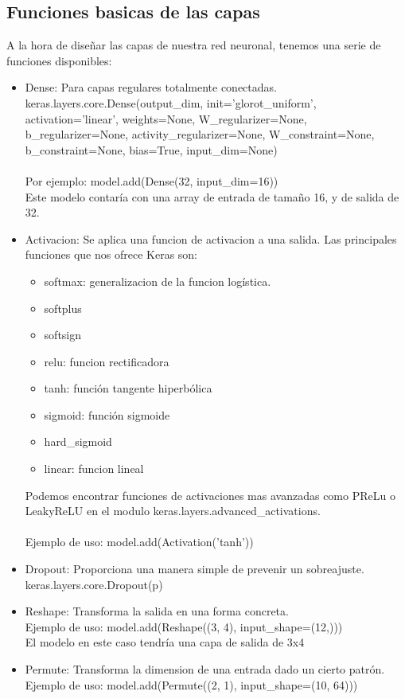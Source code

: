 \subsection{Funciones basicas de las capas}
A la hora de diseñar las capas de nuestra red neuronal, tenemos una serie de funciones disponibles:
\begin{itemize}
\item Dense: Para capas regulares totalmente conectadas.\\
keras.layers.core.Dense(output\_dim, init='glorot\_uniform', activation='linear', weights=None, W\_regularizer=None, b\_regularizer=None, activity\_regularizer=None, W\_constraint=None, b\_constraint=None, bias=True, input\_dim=None)\\\\
Por ejemplo: model.add(Dense(32, input\_dim=16))\\
Este modelo contaría con una array de entrada de tamaño 16, y de salida de 32.
\item Activacion: Se aplica una funcion de activacion a una salida. Las principales funciones que nos ofrece Keras son:
\begin{itemize}
\item softmax: generalizacion de la funcion logística.
\item softplus
\item softsign
\item relu: funcion rectificadora
\item tanh: función tangente hiperbólica
\item sigmoid: función sigmoide
\item hard\_sigmoid
\item linear: funcion lineal
\end{itemize}
Podemos encontrar funciones de activaciones mas avanzadas como PReLu o LeakyReLU en el modulo keras.layers.advanced\_activations.\\\\
Ejemplo de uso: model.add(Activation('tanh'))\\
\item Dropout: Proporciona una manera simple de prevenir un sobreajuste. \\
keras.layers.core.Dropout(p)
\item Reshape: Transforma la salida en una forma concreta.\\
Ejemplo de uso: model.add(Reshape((3, 4), input\_shape=(12,)))\\
El modelo en este caso tendría una capa de salida de 3x4\\
\item Permute: Transforma la dimension de una entrada dado un cierto patrón.\\
Ejemplo de uso: model.add(Permute((2, 1), input\_shape=(10, 64)))\\


\end{itemize}


